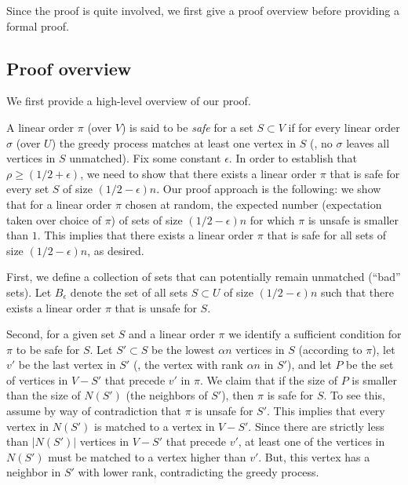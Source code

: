 %
Since the proof is quite involved, we first give a proof overview before providing a formal proof. 

%
%
%
%

\subsection{Proof overview}
\label{sec:proof-overview}

We first provide a high-level %
overview of our proof.  %
%

A linear order $\pi$ (over $V$) is said to be \emph{safe} for a set $S \subset V$ if for every linear order $\sigma$ (over $U$) the greedy process matches at least one vertex in $S$ (\ie, no $\sigma$ leaves all vertices in $S$ unmatched).
Fix some constant $\epsilon$. In order to establish that $\rho \geq (1/2 + \epsilon)$, we need to show that there exists a linear order $\pi$ that is safe for every set $S$ of size $(1/2-\epsilon)n$.
Our proof approach is the following: we show that for a linear order $\pi$ chosen
%
at random, the expected number (expectation taken over choice of $\pi$) of sets of size $(1/2-\epsilon)n$ for which $\pi$ is unsafe is smaller than $1$.
This implies that there exists a linear order $\pi$ that is safe for all sets of size $(1/2-\epsilon)n$, as desired.

First, we define a collection of sets that can potentially remain unmatched (``bad'' sets).
%
%
%
Let $B_\epsilon$ denote the set of all sets $S \subset U$ of size $(1/2-\epsilon)n$ such that there exists a linear order $\pi$ that is unsafe for $S$.

Second, for a given set $S$ and a linear order $\pi$ we identify a sufficient condition for $\pi$ to be safe for $S$.
Let $S' \subset S$ be the lowest $\alpha n$ vertices in $S$ (according to $\pi$), let $v'$ be the last vertex in $S'$ (\ie, the vertex with rank $\alpha n$ in $S'$), and let $P$ be the set of vertices in $V - S'$ that precede $v'$ in $\pi$.
%
We claim that if the size of $P$ is smaller than the size of $N(S')$ (the neighbors of $S'$), then $\pi$ is safe for $S$.
To see this, assume by way of contradiction that $\pi$ is unsafe for $S'$.
This implies that every vertex in $N(S')$ is matched to a vertex in $V - S'$.
Since there are strictly less than $|N(S')|$ vertices in $V - S'$ that precede $v'$, at least one of the vertices in $N(S')$ must be matched to a vertex higher than $v'$. But, this vertex has a neighbor in $S'$ with lower rank, contradicting the greedy process.

